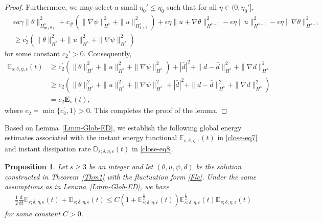 \documentclass[reqno,11pt]{amsart}
\newtheorem{proposition}{Proposition}[section]
\numberwithin{equation}{section}
\def\d{\mathrm{d}}
\def\w{\mathfrak{w}}
\begin{document}
\begin{proof}
Furthermore, we may select a small $\eta_0' \leq \eta_0$ such that for all $\eta \in (0,\eta_0']$,
\begin{equation*}
\begin{aligned}
&\epsilon a \gamma \|\theta\|_{H_{ \w (\theta) }^s}^2 + c_{\#} \left( \|\nabla \psi\|_{H^s}^2 + \|u \|_{H^s_{1 + \theta}}^2 \right) + \epsilon \eta \|u + \nabla \theta\|_{H^{s-1}}^2 - \epsilon \eta \|u\|_{H^{s-1}}^2 - \epsilon \eta \|\nabla \theta\|_{H^{s-1}}^2\\&
\geq c_{2}^\prime \left( \|\theta\|_{H^{s}}^{2} + \|u\|_{H^{s}}^{2} + \|\nabla \psi\|_{H^s}^2 \right)
\end{aligned}
\end{equation*}
for some constant $c_{2}' > 0$. Consequently,
\begin{equation}\label{close-eq16}
\begin{aligned}
\mathbb{E}_{s;\delta,\eta, \epsilon}(t)
&\geq c_{2}^\prime \left( \|\theta\|_{H^{s}}^{2} + \|u\|_{H^{s}}^{2} + \|\nabla \psi\|_{H^s}^2 \right) + |\bar{d}|^2 + \|d - \bar{d}\|_{H^s}^2 + \|\nabla d\|_{H^s}^2
\\&\geq c_{2} \left( \|\theta\|_{H^s}^2 + \|u\|_{H^s}^2 + \|\nabla \psi\|_{H^s}^2 + |\bar{d}|^2 + \|d - \bar{d}\|_{H^s}^2 + \|\nabla d\|_{H^s}^2 \right) \\
& = c_2 \mathbf{E}_s(t),
\end{aligned}
\end{equation}
where $c_2 = \min\{c_2^\prime, 1 \}>0$. This completes the proof of the lemma.
\end{proof}

Based on Lemma~\ref{Lmm-Glob-ED}, we establish the following global energy estimates associated with the instant energy functional $\mathbb{E}_{s;\delta,\eta, \epsilon}(t)$ in \eqref{close-eq7} and instant dissipation rate $\mathbb{D}_{s;\delta,\eta, \epsilon}(t)$ in \eqref{close-eq8}.

\begin{proposition}\label{Prop-Global}
    Let $s \geq 3$ be an integer and let $(\theta, u, \psi, d)$ be the solution constructed in Theorem~\ref{Thm1} with the fluctuation form \eqref{Flc}. Under the same assumptions as in Lemma~\ref{Lmm-Glob-ED}, we have
\begin{equation}\label{close-eq21}
\begin{aligned}
\frac{1}{2} \frac{\d}{\d t}\mathbb{E}_{s;\delta,\eta, \epsilon}(t)+\mathbb{D}_{s;\delta,\eta, \epsilon}(t)\leq C (1+\mathbb{E}^{\frac{s}{2}}_{s;\delta,\eta, \epsilon}(t))\mathbb{E}^{\frac{1}{2}}_{s;\delta,\eta, \epsilon}(t)\mathbb{D}_{s;\delta,\eta, \epsilon}(t)
\end{aligned}
\end{equation}
for some constant $C > 0$.
\end{proposition}
\end{document}
